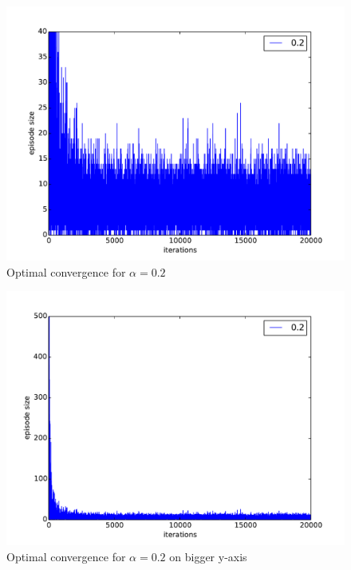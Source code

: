 \documentclass[paper=a4, fontsize=11pt]{scrartcl}
\numberwithin{equation}{section}		%
\numberwithin{figure}{section}			%
\numberwithin{table}{section}				%
\begin{document}
\begin{figure}[H] \centering
\includegraphics[scale=0.4]{alpha0_2.pdf}
\caption{Optimal convergence for $\alpha=0.2$} 
\label{figure:alpha02}
\end{figure}

\begin{figure}[H] \centering
\includegraphics[scale=0.4]{alpha0_2bigY.pdf}
\caption{Optimal convergence for $\alpha=0.2$ on bigger y-axis} 
\label{figure:alpha02Big}
\end{figure}
\end{document}

